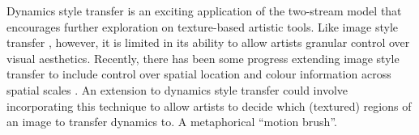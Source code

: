Dynamics style transfer is an exciting application of the two-stream model that encourages further exploration on texture-based artistic tools. Like image style transfer \cite{gatys2016image}, however, it is limited in its ability to allow artists granular control over visual aesthetics. Recently, there has been some progress extending image style transfer to include control over spatial location and colour information across spatial scales \cite{gatys2017}. An extension to dynamics style transfer could involve incorporating this technique to allow artists to decide which (textured) regions of an image to transfer dynamics to. A metaphorical ``motion brush''.